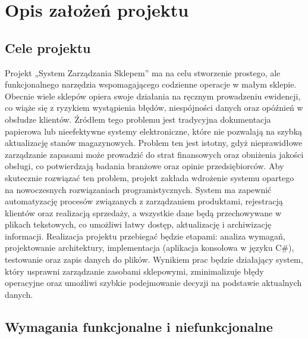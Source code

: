\chapter{Opis założeń projektu}

\section{Cele projektu}
Projekt „System Zarządzania Sklepem” ma na celu stworzenie prostego, ale funkcjonalnego narzędzia wspomagającego codzienne operacje w małym sklepie. Obecnie wiele sklepów opiera swoje działania na ręcznym prowadzeniu ewidencji, co wiąże się z ryzykiem wystąpienia błędów, niespójności danych oraz opóźnień w obsłudze klientów. Źródłem tego problemu jest tradycyjna dokumentacja papierowa lub nieefektywne systemy elektroniczne, które nie pozwalają na szybką aktualizację stanów magazynowych. Problem ten jest istotny, gdyż nieprawidłowe zarządzanie zapasami może prowadzić do strat finansowych oraz obniżenia jakości obsługi, co potwierdzają badania branżowe oraz opinie przedsiębiorców. Aby skutecznie rozwiązać ten problem, projekt zakłada wdrożenie systemu opartego na nowoczesnych rozwiązaniach programistycznych. System ma zapewnić automatyzację procesów związanych z zarządzaniem produktami, rejestracją klientów oraz realizacją sprzedaży, a wszystkie dane będą przechowywane w plikach tekstowych, co umożliwi łatwy dostęp, aktualizację i archiwizację informacji. Realizacja projektu przebiegać będzie etapami: analiza wymagań, projektowanie architektury, implementacja (aplikacja konsolowa w języku C\#), testowanie oraz zapis danych do plików. Wynikiem prac będzie działający system, który usprawni zarządzanie zasobami sklepowymi, zminimalizuje błędy operacyjne oraz umożliwi szybkie podejmowanie decyzji na podstawie aktualnych danych.

\section{Wymagania funkcjonalne i niefunkcjonalne}

